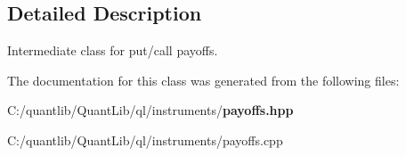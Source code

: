 \subsection{Detailed Description}
Intermediate class for put/call payoffs. 

The documentation for this class was generated from the following files\+:\begin{DoxyCompactItemize}
\item 
C\+:/quantlib/\+Quant\+Lib/ql/instruments/{\bf payoffs.\+hpp}\item 
C\+:/quantlib/\+Quant\+Lib/ql/instruments/payoffs.\+cpp\end{DoxyCompactItemize}
